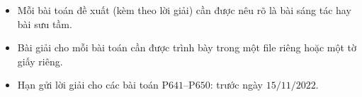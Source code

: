 \thispagestyle{thachthuctoanhocnone}
\pagestyle{thachthuctoanhoc}
\everymath{\color{thachthuctoanhoc}}
\graphicspath{{../thachthuctoanhoc/pic/}}
\begingroup
{}
\centering
\vspace*{4cm}
\endgroup
\vspace*{-8pt}
\begin{tBox}
	\begin{itemize}[leftmargin = 13pt, itemsep = 1.0pt] 
				\item Mỗi bài toán đề xuất (kèm theo lời giải) cần được nêu rõ là bài sáng tác hay bài sưu tầm.
		\item Bài giải cho mỗi bài toán cần được trình bày trong một file riêng hoặc
		một tờ giấy riêng.
		\item Hạn gửi lời giải cho các bài toán P$641$--P$650$: trước ngày $15/11/2022$.
	\end{itemize}
\end{tBox}
